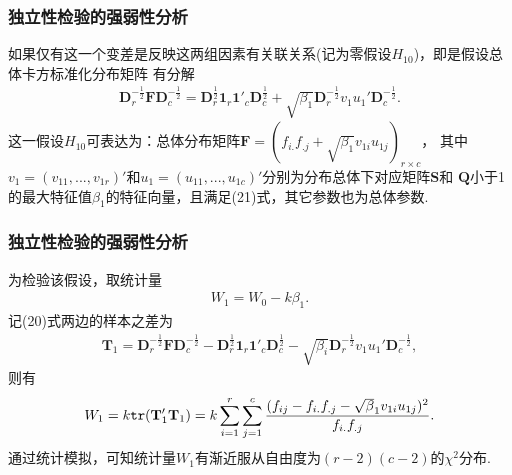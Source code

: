 \begin{frame}\frametitle{\color{blue}独立性检验的强弱性分析}
 \begin{footnotesize}
 \quad\quad 如果仅有这一个变差是反映这两组因素有关联关系(记为零假设$H_{10}$)，即是假设总体卡方标准化分布矩阵
有分解
\begin{eqnarray}
     \mathbf{D}^{-\frac{1}{2}}_{r}\mathbf{F}\mathbf{D}^{-\frac{1}{2}}_{c}=
     \mathbf{D}^{\frac{1}{2}}_{r}\mathbf{1}_{r}\mathbf{1}'_{c}\mathbf{D}^{\frac{1}{2}}_{c}+
     \sqrt{\beta_{1}}\mathbf{D}^{-\frac{1}{2}}_{r}v_{1}u_{1}'\mathbf{D}^{-\frac{1}{2}}_{c}.
\end{eqnarray}
这一假设$H_{10}$可表达为：总体分布矩阵$\mathbf{F}=(f_{i.}f_{.j}+\sqrt{\beta_{1}}v_{1i}u_{1j})_{r\times
c}$，
其中$v_{1}=(v_{11},...,v_{1r})'$和$u_{1}=(u_{11},...,u_{1c})'$分别为分布总体下对应矩阵$\mathbf{S}$和
$\mathbf{Q}$小于1的最大特征值$\beta_{1}$的特征向量，且满足(21)式，其它参数也为总体参数.\\
\end{footnotesize}
\end{frame}
\begin{frame}\frametitle{\color{blue}独立性检验的强弱性分析}
 \begin{footnotesize}
 \quad\quad 为检验该假设，取统计量
\begin{eqnarray}
     W_{1}=W_{0}-k\beta_{1}.  \nonumber
\end{eqnarray}
记(20)式两边的样本之差为
\begin{eqnarray}
  \mathbf{T}_{1}=\mathbf{D}^{-\frac{1}{2}}_{r}\mathbf{F}\mathbf{D}^{-\frac{1}{2}}_{c}-
                \mathbf{D}^{\frac{1}{2}}_{r}\mathbf{1}_{r}\mathbf{1}'_{c}\mathbf{D}^{\frac{1}{2}}_{c}-
                \sqrt{\beta_{i}}\mathbf{D}^{-\frac{1}{2}}_{r}v_{1}u_{1}'\mathbf{D}^{-\frac{1}{2}}_{c},
                \nonumber
\end{eqnarray}
则有
\begin{eqnarray}
                W_{1}=k{\tt{tr}}(\mathbf{T}_{1}'\mathbf{T}_{1})=
                      k\sum^{r}_{i=1}\sum^{c}_{j=1}\frac{(f_{ij}-f_{i.}f_{.j}-\sqrt{\beta}_{1}v_{1i}u_{1j})^{2}}
                      {f_{i.}f_{.j}}.
                \nonumber
\end{eqnarray}
通过统计模拟，可知统计量$W_{1}$有渐近服从自由度为$(r-2)(c-2)$的$\chi^{2}$分布.\\
\end{footnotesize}
\end{frame}
